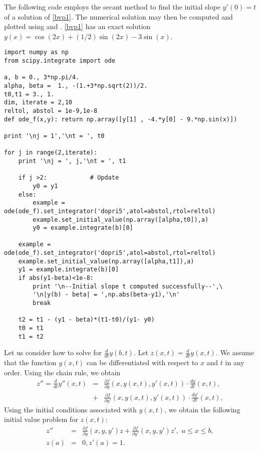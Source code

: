 The following code employs the secant method to find the initial slope $y'(0) = t$ of a solution of \ref{bvp1}. The numerical solution may then be computed and plotted using  and . \ref{bvp1} has an exact solution $y(x) = \cos(2x) + (1/2)\sin(2x) -3\sin(x)$.

\begin{lstlisting}
import numpy as np
from scipy.integrate import ode

a, b = 0., 3*np.pi/4.
alpha, beta =  1., -(1.+3*np.sqrt(2))/2.
t0,t1 = 3., 1.
dim, iterate = 2,10
reltol, abstol = 1e-9,1e-8
def ode_f(x,y): return np.array([y[1] , -4.*y[0] - 9.*np.sin(x)])
	
print '\nj = 1','\nt = ', t0
	
for j in range(2,iterate):
	print '\nj = ', j,'\nt = ', t1
		
	if j >2: 			# Update
		y0 = y1
	else:
		example = ode(ode_f).set_integrator('dopri5',atol=abstol,rtol=reltol) 
		example.set_initial_value(np.array([alpha,t0]),a) 
		y0 = example.integrate(b)[0]
			
	example = ode(ode_f).set_integrator('dopri5',atol=abstol,rtol=reltol) 
	example.set_initial_value(np.array([alpha,t1]),a) 
	y1 = example.integrate(b)[0]
	if abs(y1-beta)<1e-8: 
		print '\n--Initial slope t computed successfully--',\
		'\n|y(b) - beta| = ',np.abs(beta-y1),'\n'
		break
		
	t2 = t1 - (y1 - beta)*(t1-t0)/(y1- y0)
	t0 = t1
	t1 = t2
\end{lstlisting}

Let us consider how to solve for $\frac{d}{dt} y(b,t)$. Let $z(x,t) = \frac{d}{dt} y(x,t).$ We assume that the function $y(x,t)$ can be differentiated with respect to $x$ and $t$ in any order.  Using the chain rule, we obtain 
\begin{eqnarray*}
z'' = \frac{d}{dt} y''(x,t) &=& \frac{\partial f}{\partial y} (x,y(x,t),y'(x,t)) \cdot \frac{dy}{dt}(x,t) ,\\
&+& \frac{\partial f}{\partial y'} (x,y(x,t),y'(x,t)) \cdot \frac{dy'}{dt}(x,t),
\end{eqnarray*}
Using the initial conditions associated with $y(x,t)$, we obtain the following initial value problem for $z(x,t)$: 
\begin{eqnarray*}
z'' &=& \frac{\partial f}{\partial y} (x,y,y') z + \frac{\partial f}{\partial y'} (x,y,y') z'
,\,\,a \leq x \leq b, \\
 z(a) &=& 0, z'(a) = 1.
\end{eqnarray*}

